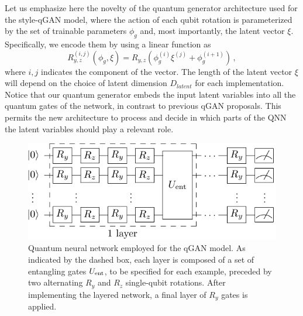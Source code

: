 \documentclass[twocolumn,preprintnumbers,superscriptaddress]{revtex4-2}
\begin{document}
Let us emphasize here the novelty of the quantum generator architecture used for the style-qGAN model, where the action of each qubit rotation is parameterized by the set of trainable parameters $\phi_g$ and, most importantly, the latent vector $\xi$. Specifically, we encode them by using a linear function as
\begin{equation}
    \label{eq:rotation} R_{y,z}^{(i,j)}\left(\phi_g, \xi\right) = R_{y,z}\left(\phi_g^{(i)} \xi^{(j)} + \phi_g^{(i+1)}\right)\,,
\end{equation}
where $i,j$ indicates the component of the vector. The length of the latent vector $\xi$ will depend on the choice of latent dimension $D_{latent}$ for each implementation. Notice that our quantum generator embeds the input latent variables into all the quantum gates of the network, in contrast to previous qGAN proposals. This permits the new architecture to process and decide in which
parts of the QNN the latent variables should play a relevant role.

\begin{figure}
  \includegraphics[width=1.0\columnwidth]{plots/ansatz1.pdf}
  \caption{\label{fig:circuit}Quantum neural network employed for the qGAN model. As indicated by the dashed box, each layer is composed of a set of entangling gates $U_{\rm ent}$, to be specified for each example, preceded by two alternating $R_y$ and $R_z$ single-qubit rotations. After implementing the layered network, a final layer of $R_y$ gates is applied.}
\end{figure}
\end{document}
